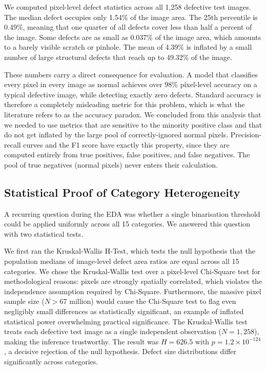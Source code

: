 \documentclass[11pt, a4paper]{article}
\begin{document}
We computed pixel-level defect statistics across all 1,258 defective test images. The median defect occupies only 1.54\% of the image area. The 25th percentile is 0.49\%, meaning that one quarter of all defects cover less than half a percent of the image. Some defects are as small as 0.037\% of the image area, which amounts to a barely visible scratch or pinhole. The mean of 4.39\% is inflated by a small number of large structural defects that reach up to 49.32\% of the image.

These numbers carry a direct consequence for evaluation. A model that classifies every pixel in every image as normal achieves over 98\% pixel-level accuracy on a typical defective image, while detecting exactly zero defects. Standard accuracy is therefore a completely misleading metric for this problem, which is what the literature refers to as the accuracy paradox. We concluded from this analysis that we needed to use metrics that are sensitive to the minority positive class and that do not get inflated by the large pool of correctly-ignored normal pixels. Precision-recall curves and the F1 score have exactly this property, since they are computed entirely from true positives, false positives, and false negatives. The pool of true negatives (normal pixels) never enters their calculation.



\subsection{Statistical Proof of Category Heterogeneity}
\label{sec:statistics}

A recurring question during the EDA was whether a single binarisation threshold could be applied uniformly across all 15 categories. We answered this question with two statistical tests.

We first ran the Kruskal-Wallis H-Test, which tests the null hypothesis that the population medians of image-level defect area ratios are equal across all 15 categories. We chose the Kruskal-Wallis test over a pixel-level Chi-Square test for methodological reasons: pixels are strongly spatially correlated, which violates the independence assumption required by Chi-Square. Furthermore, the massive pixel sample size ($N > 67$ million) would cause the Chi-Square test to flag even negligibly small differences as statistically significant, an example of inflated statistical power overwhelming practical significance. The Kruskal-Wallis test treats each defective test image as a single independent observation ($N = 1,258$), making the inference trustworthy. The result was $H = 626.5$ with $p = 1.2 \times 10^{-124}$, a decisive rejection of the null hypothesis. Defect size distributions differ significantly across categories.
\end{document}
